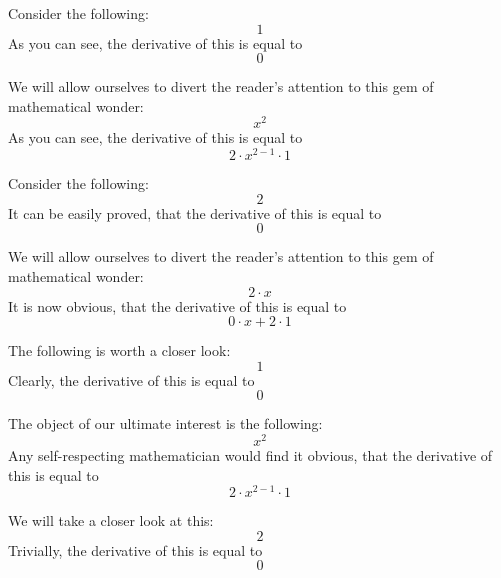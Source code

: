 \documentclass{article}
\begin{document}
Consider the following:
\begin{equation}
1 
\end{equation}
As you can see, the derivative of this is equal to
\begin{equation}
0 
\end{equation}

We will allow ourselves to divert the reader's attention to this gem of mathematical wonder:
\begin{equation}
x ^{2 } 
\end{equation}
As you can see, the derivative of this is equal to
\begin{equation}
2 \cdot x ^{2 - 1 } \cdot 1 
\end{equation}

Consider the following:
\begin{equation}
2 
\end{equation}
It can be easily proved, that the derivative of this is equal to
\begin{equation}
0 
\end{equation}

We will allow ourselves to divert the reader's attention to this gem of mathematical wonder:
\begin{equation}
2 \cdot x 
\end{equation}
It is now obvious, that the derivative of this is equal to
\begin{equation}
0 \cdot x + 2 \cdot 1 
\end{equation}

The following is worth a closer look:
\begin{equation}
1 
\end{equation}
Clearly, the derivative of this is equal to
\begin{equation}
0 
\end{equation}

The object of our ultimate interest is the following:
\begin{equation}
x ^{2 } 
\end{equation}
Any self-respecting mathematician would find it obvious, that the derivative of this is equal to
\begin{equation}
2 \cdot x ^{2 - 1 } \cdot 1 
\end{equation}

We will take a closer look at this:
\begin{equation}
2 
\end{equation}
Trivially, the derivative of this is equal to
\begin{equation}
0 
\end{equation}
\end{document}
